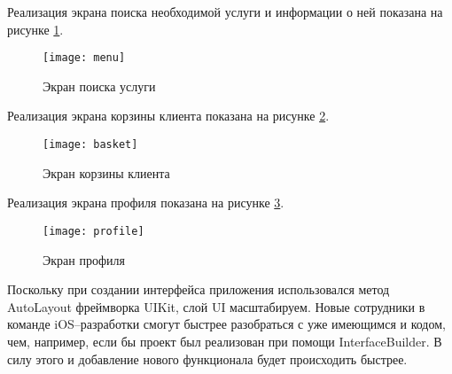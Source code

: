 Реализация экрана поиска необходимой услуги и информации о ней показана на рисунке \ref{menu}.

\begin{figure}[H]
	\centering
	\texttt{[image: menu]}
	\caption{Экран поиска услуги}
	\label{menu}
\end{figure}

Реализация экрана корзины клиента показана на рисунке \ref{basket}.

\begin{figure}[H]
	\centering
	\texttt{[image: basket]}
	\caption{Экран корзины клиента}
	\label{basket}
\end{figure}

Реализация экрана профиля показана на рисунке \ref{profile}.

\begin{figure}[H]
	\centering
	\texttt{[image: profile]}
	\caption{Экран профиля}
	\label{profile}
\end{figure}

Поскольку при создании интерфейса приложения использовался метод AutoLayout фреймворка UIKit, слой UI масштабируем. Новые сотрудники в команде iOS--разработки смогут быстрее разобраться с уже имеющимся и кодом, чем, например, если бы проект был реализован при помощи InterfaceBuilder. В силу этого и добавление нового функционала будет происходить быстрее. 

\clearpage
